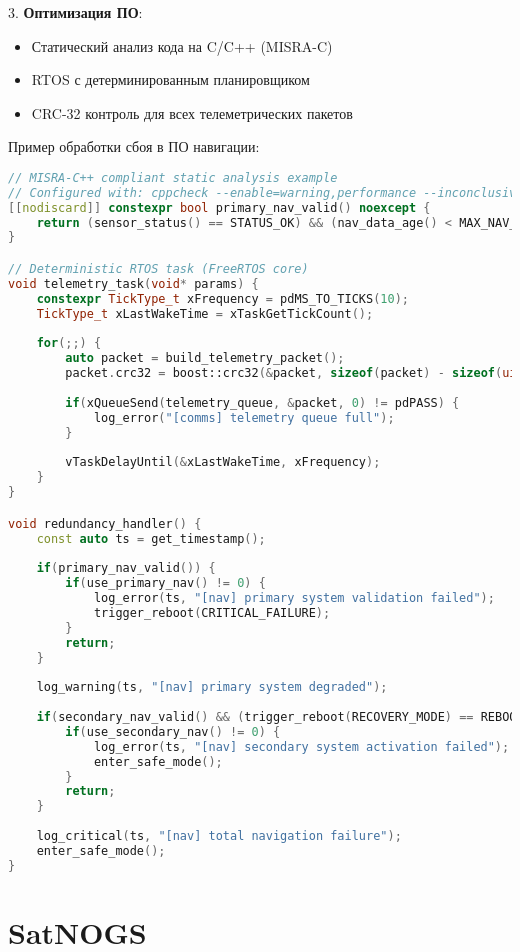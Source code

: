 3. \textbf{Оптимизация ПО}:  
\begin{itemize}
    \item Статический анализ кода на C/C++ (MISRA-C)
    \item RTOS с детерминированным планировщиком
    \item CRC-32 контроль для всех телеметрических пакетов
\end{itemize}

Пример обработки сбоя в ПО навигации:  
\begin{lstlisting}[language=C++]  
// MISRA-C++ compliant static analysis example
// Configured with: cppcheck --enable=warning,performance --inconclusive --std=c++17
[[nodiscard]] constexpr bool primary_nav_valid() noexcept {
    return (sensor_status() == STATUS_OK) && (nav_data_age() < MAX_NAV_AGE);
}

// Deterministic RTOS task (FreeRTOS core)
void telemetry_task(void* params) {
    constexpr TickType_t xFrequency = pdMS_TO_TICKS(10);
    TickType_t xLastWakeTime = xTaskGetTickCount();
    
    for(;;) {
        auto packet = build_telemetry_packet();
        packet.crc32 = boost::crc32(&packet, sizeof(packet) - sizeof(uint32_t));
        
        if(xQueueSend(telemetry_queue, &packet, 0) != pdPASS) {
            log_error("[comms] telemetry queue full");
        }
        
        vTaskDelayUntil(&xLastWakeTime, xFrequency);
    }
}

void redundancy_handler() {
    const auto ts = get_timestamp();
    
    if(primary_nav_valid()) {
        if(use_primary_nav() != 0) {
            log_error(ts, "[nav] primary system validation failed");
            trigger_reboot(CRITICAL_FAILURE);
        }
        return;
    }
    
    log_warning(ts, "[nav] primary system degraded");
    
    if(secondary_nav_valid() && (trigger_reboot(RECOVERY_MODE) == REBOOT_SUCCESS)) {
        if(use_secondary_nav() != 0) {
            log_error(ts, "[nav] secondary system activation failed");
            enter_safe_mode();
        }
        return;
    }
    
    log_critical(ts, "[nav] total navigation failure");
    enter_safe_mode();
}
\end{lstlisting}  

\section{SatNOGS}


